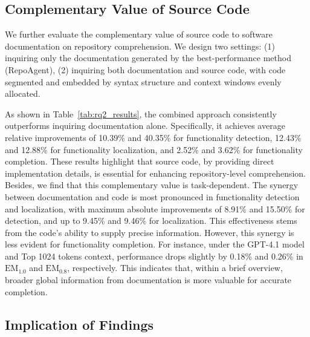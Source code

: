 

\subsection{Complementary Value of Source Code}

We further evaluate the complementary value of source code to software documentation on repository comprehension. We design two settings: (1) inquiring only the documentation generated by the best-performance method (RepoAgent),  (2) inquiring both documentation and source code, with code segmented and embedded by syntax structure and context windows evenly allocated. 

As shown in Table~\ref{tab:rq2_results}, the combined approach consistently outperforms inquiring documentation alone. Specifically, it achieves average relative improvements of 10.39\% and 40.35\% for functionality detection, 12.43\% and 12.88\% for functionality localization, and 2.52\% and 3.62\% for functionality completion. These results highlight that source code, by providing direct implementation details, is essential for enhancing repository-level comprehension. Besides, we find that this complementary value is task-dependent. The synergy between documentation and code is most pronounced in functionality detection and localization, with maximum absolute improvements of 8.91\% and 15.50\% for detection, and up to 9.45\% and 9.46\% for localization. This effectiveness stems from the code's ability to supply precise information. However, this synergy is less evident for functionality completion. For instance, under the GPT-4.1 model and Top 1024 tokens context, performance drops slightly by 0.18\% and 0.26\% in $\text{EM}_{1.0}$ and $\text{EM}_{0.8}$, respectively. This indicates that, within a brief overview, broader global information from documentation is more valuable for accurate completion.


\subsection{Implication of Findings}

